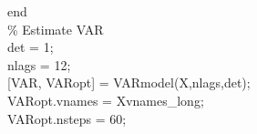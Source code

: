 \hspace{1mm}\hspace{5mm} \hspace{5mm} \hspace{5mm} \hspace{5mm} \hspace{5mm} \textcolor{matlabblue}{end} \\ 
\hspace{1mm}\hspace{5mm} \hspace{5mm} \hspace{5mm} \hspace{5mm} \hspace{5mm} \textcolor{matlabgreen}{\% Estimate VAR }\\ 
\hspace{1mm}\hspace{5mm} \hspace{5mm} \hspace{5mm} \hspace{5mm} \hspace{5mm} det = 1; \\ 
\hspace{1mm}\hspace{5mm} \hspace{5mm} \hspace{5mm} \hspace{5mm} \hspace{5mm} nlags = 12; \\ 
\hspace{1mm}\hspace{5mm} \hspace{5mm} \hspace{5mm} \hspace{5mm} \hspace{5mm} [VAR, VARopt] = VARmodel(X,nlags,det); \\ 
\hspace{1mm}\hspace{5mm} \hspace{5mm} \hspace{5mm} \hspace{5mm} \hspace{5mm} VARopt.vnames = Xvnames\_long; \\ 
\hspace{1mm}\hspace{5mm} \hspace{5mm} \hspace{5mm} \hspace{5mm} \hspace{5mm} VARopt.nsteps = 60; \\ 
